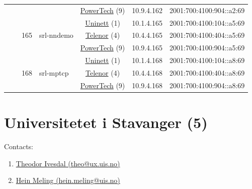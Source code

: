 \begin{small}
\begin{center}
\begin{longtable}{|c|c|c|c|c|c|c|c|}
  &  &  &  & \multicolumn{2}{|c|}{\tiny{\href{http://www.powertech.no}{PowerTech} (9)}} & \tiny{10.9.4.162} & \tiny{2001:700:4100:904::a2:69} \\* \cline{3-3}\cline{4-4}\cline{5-5}\cline{6-6}\cline{7-7}\cline{8-8}
  &  & \multirow{3}{*}{\tiny{165}} & \multicolumn{1}{|l|}{\multirow{3}{*}{\tiny{srl-nndemo}}} & \multicolumn{2}{|c|}{\tiny{\href{https://www.uninett.no}{Uninett} (1)}} & \tiny{10.1.4.165} & \tiny{2001:700:4100:104::a5:69} \\* \cline{5-5}\cline{6-6}\cline{7-7}\cline{8-8}
  &  &  &  & \multicolumn{2}{|c|}{\tiny{\href{https://www.telenor.no}{Telenor} (4)}} & \tiny{10.4.4.165} & \tiny{2001:700:4100:404::a5:69} \\* \cline{5-5}\cline{6-6}\cline{7-7}\cline{8-8}
  &  &  &  & \multicolumn{2}{|c|}{\tiny{\href{http://www.powertech.no}{PowerTech} (9)}} & \tiny{10.9.4.165} & \tiny{2001:700:4100:904::a5:69} \\* \cline{3-3}\cline{4-4}\cline{5-5}\cline{6-6}\cline{7-7}\cline{8-8}
  &  & \multirow{3}{*}{\tiny{168}} & \multicolumn{1}{|l|}{\multirow{3}{*}{\tiny{srl-mptcp}}} & \multicolumn{2}{|c|}{\tiny{\href{https://www.uninett.no}{Uninett} (1)}} & \tiny{10.1.4.168} & \tiny{2001:700:4100:104::a8:69} \\* \cline{5-5}\cline{6-6}\cline{7-7}\cline{8-8}
  &  &  &  & \multicolumn{2}{|c|}{\tiny{\href{https://www.telenor.no}{Telenor} (4)}} & \tiny{10.4.4.168} & \tiny{2001:700:4100:404::a8:69} \\* \cline{5-5}\cline{6-6}\cline{7-7}\cline{8-8}
  &  &  &  & \multicolumn{2}{|c|}{\tiny{\href{http://www.powertech.no}{PowerTech} (9)}} & \tiny{10.9.4.168} & \tiny{2001:700:4100:904::a8:69} \\ \hline
\end{longtable}
\end{center}
\end{small}



\section{Universitetet i Stavanger (5)}
\label{sec:UiS}

Contacts:
\begin{enumerate}
 \item {}\href{mailto:theo@ux.uis.no}{Theodor Ivesdal (theo@ux.uis.no)}
 \item {}\href{mailto:hein.meling@uis.no}{Hein Meling (hein.meling@uis.no)}
\end{enumerate}


